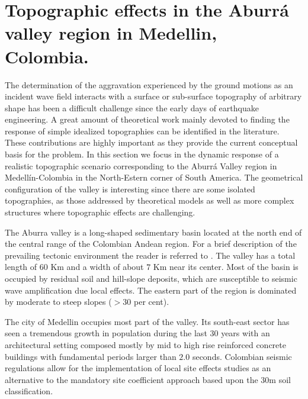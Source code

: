 \documentclass[11pt,letterpaper]{article}
\begin{document}

\newpage
\section{Topographic effects in the Aburrá valley region in Medellin, Colombia.}
{}

The determination of the aggravation experienced by the ground motions as an incident wave field interacts with a surface or sub-surface topography of arbitrary shape has been a difficult challenge since the early days of earthquake engineering. A great amount of theoretical work mainly devoted to finding the response of simple idealized topographies can be identified in the literature. These contributions are highly important as they provide the current conceptual basis for the problem. In this section we focus in the dynamic response of a realistic topographic scenario corresponding to the Aburrá Valley region in Medellín-Colombia in the North-Estern corner of South America. The geometrical configuration of the valley is interesting since there are some isolated topographies, as those addressed by theoretical models as well as more complex structures where topographic effects are challenging. 

The Aburra valley is a long-shaped sedimentary basin located at the north end of the central range of the Colombian Andean region. For a brief description of the prevailing tectonic environment the reader is referred to \cite{restrepo2016effects}. The valley has a total length of $60$ Km and a width of about $7$ Km near its center. Most of the basin is occupied by residual soil and hill-slope deposits, which are susceptible to seismic wave amplification due local effects. The eastern part of the region is dominated by moderate to steep slopes ($>30$ per cent).


The city of Medellin occupies most part of the valley. Its south-east sector has seen a tremendous growth in population during the last 30 years with an architectural setting composed mostly by mid to high rise reinforced concrete buildings with fundamental periods larger than $2.0$ seconds. Colombian seismic regulations allow for the implementation of local site effects studies as an alternative to the mandatory site coefficient approach based upon the $30$m soil classification.
\end{document}
